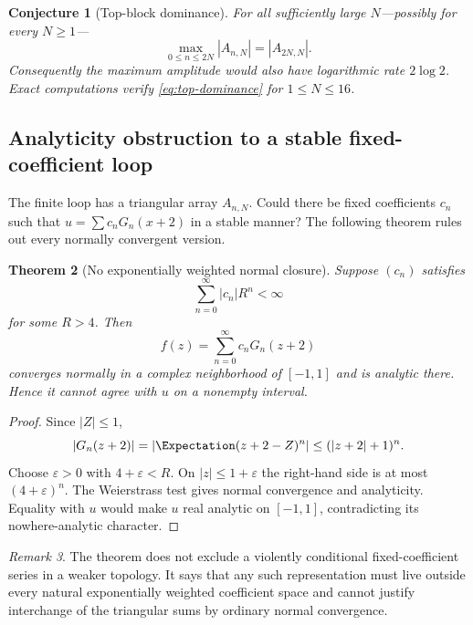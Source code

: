 \documentclass[11pt,oneside]{article}
\newtheorem{theorem}{Theorem}[section]
\newtheorem{conjecture}[theorem]{Conjecture}
\theoremstyle{definition}
\theoremstyle{remark}
\newtheorem{remark}[theorem]{Remark}
\newcommand{\eps}{\varepsilon}
\begin{document}
\begin{conjecture}[Top-block dominance]
\label{conj:top-dominance}
For all sufficiently large $N$---possibly for every $N\ge1$---
\begin{equation}
 \max_{0\le n\le2N}|A_{n,N}|=|A_{2N,N}|.
 \label{eq:top-dominance}
\end{equation}
Consequently the maximum amplitude would also have logarithmic rate
$2\log2$.  Exact computations verify \eqref{eq:top-dominance} for
$1\le N\le16$.
\end{conjecture}

\subsection{Analyticity obstruction to a stable fixed-coefficient loop}
\label{sec:analyticity-obstruction}
The finite loop has a triangular array $A_{n,N}$.  Could there be fixed
coefficients $c_n$ such that $u=\sum c_nG_n(x+2)$ in a stable manner?  The
following theorem rules out every normally convergent version.

\begin{theorem}[No exponentially weighted normal closure]
\label{thm:no-normal-closure}
Suppose $(c_n)$ satisfies
\begin{equation}
 \sum_{n=0}^{\infty}|c_n|R^n<\infty
 \label{eq:weighted-l1}
\end{equation}
for some $R>4$.  Then
\begin{equation}
 f(z)=\sum_{n=0}^{\infty}c_nG_n(z+2)
 \label{eq:fixed-G-series}
\end{equation}
converges normally in a complex neighborhood of $[-1,1]$ and is analytic
there.  Hence it cannot agree with $u$ on a nonempty interval.
\end{theorem}

\begin{proof}
Since $|Z|\le1$,
\[
 |G_n(z+2)|=|\Expectation(z+2-Z)^n|
 \le(|z+2|+1)^n.
\]
Choose $\eps>0$ with $4+\eps<R$.  On $|z|\le1+\eps$ the right-hand side is
at most $(4+\eps)^n$.  The Weierstrass test gives normal convergence and
analyticity.  Equality with $u$ would make $u$ real analytic on
$[-1,1]$, contradicting its nowhere-analytic character.
\end{proof}

\begin{remark}
The theorem does not exclude a violently conditional fixed-coefficient
series in a weaker topology.  It says that any such representation must
live outside every natural exponentially weighted coefficient space and
cannot justify interchange of the triangular sums by ordinary normal
convergence.
\end{remark}
\end{document}
